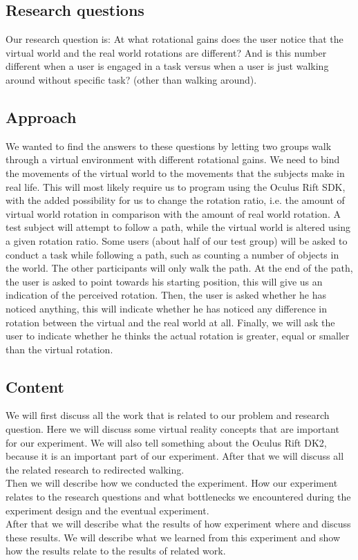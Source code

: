 \subsection{Research questions}\label{sec:questions}
Our research question is: At what rotational gains does the user notice that the virtual world and the real world rotations are different?
And is this number different when a user is engaged in a task versus when a user is just walking around without specific task? (other than walking around).

\subsection{Approach}\label{sec:approach}
We wanted to find the answers to these questions by letting two groups walk through a virtual environment with different rotational gains. We need to bind the movements of the virtual world to the movements that the subjects make in real life.
This will most likely require us to program using the  Oculus Rift SDK, with the added possibility for us to change the rotation ratio, i.e. the amount of virtual world rotation in comparison with the amount of real world rotation.
A test subject will attempt to follow a path, while the virtual world is altered using a given rotation ratio.
Some users (about half of our test group) will be asked to conduct a task while following a path, such as counting a number of objects in the world.
The other participants will only walk the path.
At the end of the path, the user is asked to point towards his starting position, this will give us an indication of the perceived rotation.
Then, the user is asked whether he has noticed anything, this will indicate whether he has noticed any difference in rotation between the virtual and the real world at all.
Finally, we will ask the user to indicate whether he thinks the actual rotation is greater, equal or smaller than the virtual rotation.

\subsection{Content}\label{sec:intro}
We will first discuss all the work that is related to our problem and research question.
Here we will discuss some virtual reality concepts that are important for our experiment.
We will also tell something about the Oculus Rift DK2, because it is an important part of our experiment. After that we will discuss all the related  research to redirected walking. \\
Then we will describe how we conducted the experiment. How our experiment relates to the research questions and  what bottlenecks we encountered during the experiment design and the eventual experiment. \\
After that we will describe what the results of how experiment where and discuss these results. We will describe what we learned from this experiment and show how the results relate to the results of related work. 